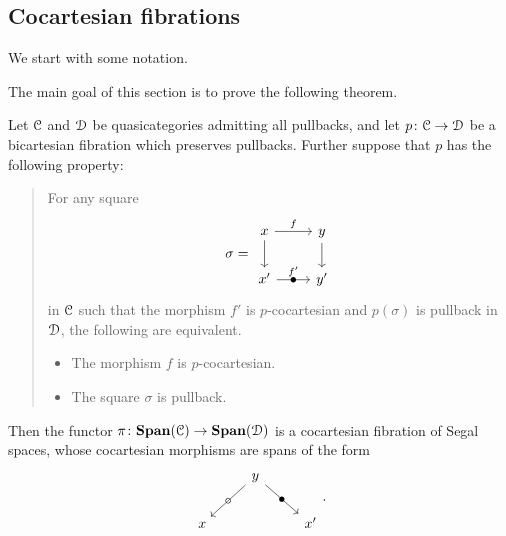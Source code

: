 \documentclass[main.tex]{subfiles}
\begin{document}
\subsection{Cocartesian fibrations}
\label{ssc:cocartesian_fibrations}

We start with some notation.

The main goal of this section is to prove the following theorem.

\begin{theorem}
  \label{thm:span_of_bicartesian_fibration_is_bicartesian_fibration}
  Let $\mathcal{C}$ and $\mathcal{D}$ be quasicategories admitting all pullbacks, and let $p\colon \mathcal{C} \to \mathcal{D}$ be a bicartesian fibration which preserves pullbacks. Further suppose that $p$ has the following property:

  \begin{quote}
    For any square
    \begin{equation*}
      \sigma =
      \begin{tikzcd}
        x
        \arrow[r, "f"]
        \arrow[d]
        & y
        \arrow[d]
        \\
        x'
        \arrow[r, "f'", "\bullet" marking]
        & y'
      \end{tikzcd}
    \end{equation*}
    in $\mathcal{C}$ such that the morphism $f'$ is $p$-cocartesian and $p(\sigma)$ is pullback in $\mathcal{D}$, the following are equivalent.
    \begin{itemize}
      \item The morphism $f$ is $p$-cocartesian.

      \item The square $\sigma$ is pullback.
    \end{itemize}
  \end{quote}

  Then the functor $\pi\colon \mathbf{Span}(\mathcal{C}) \to \mathbf{Span}(\mathcal{D})$ is a cocartesian fibration of Segal spaces, whose cocartesian morphisms are spans of the form
  \begin{equation*}
    \begin{tikzcd}
      & y
      \arrow[dl, "\circ" marking]
      \arrow[dr, "\bullet" marking]
      \\
      x
      && x'
    \end{tikzcd}.
  \end{equation*}
\end{theorem}
\end{document}
